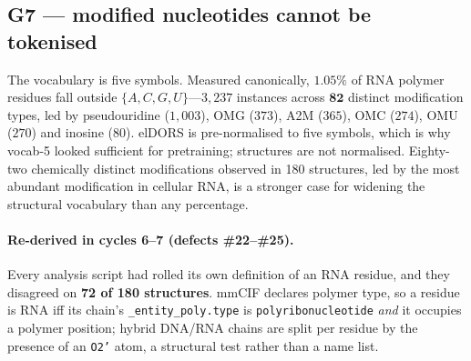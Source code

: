 \documentclass[11pt,a4paper]{article}
\begin{document}
\subsection{G7 --- modified nucleotides cannot be tokenised}

The vocabulary is five symbols. Measured canonically, $\mathbf{1.05\%}$ of RNA
polymer residues fall outside $\{A,C,G,U\}$---$3{,}237$ instances across
$\mathbf{82}$ distinct modification types, led by pseudouridine ($1{,}003$), OMG
($373$), A2M ($365$), OMC ($274$), OMU ($270$) and inosine ($80$). elDORS is
pre-normalised to five symbols, which is why vocab-5 looked sufficient for
pretraining; structures are not normalised. Eighty-two chemically distinct
modifications observed in 180 structures, led by the most abundant modification
in cellular RNA, is a stronger case for widening the structural vocabulary than
any percentage.

\paragraph{Re-derived in cycles 6--7 (defects \#22--\#25).} Every analysis script
had rolled its own definition of an RNA residue, and they disagreed on \textbf{72
of 180 structures}. mmCIF declares polymer type, so a residue is RNA iff its
chain's \texttt{\_entity\_poly.type} is \texttt{polyribonucleotide} \emph{and} it
occupies a polymer position; hybrid DNA/RNA chains are split per residue by the
presence of an \texttt{O2'} atom, a structural test rather than a name list.
\end{document}
